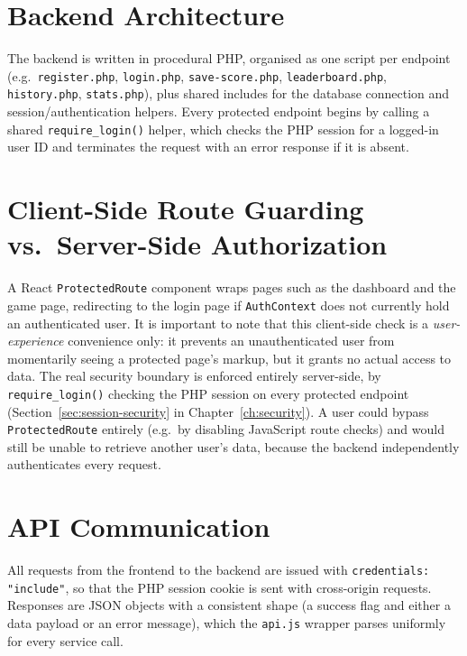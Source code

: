 \section{Backend Architecture}
The backend is written in procedural PHP, organised as one script per
endpoint (e.g.\ \texttt{register.php}, \texttt{login.php},
\texttt{save-score.php}, \texttt{leaderboard.php}, \texttt{history.php},
\texttt{stats.php}), plus shared includes for the database connection and
session/authentication helpers. Every protected endpoint begins by calling a
shared \texttt{require\_login()} helper, which checks the PHP session for a
logged-in user ID and terminates the request with an error response if it
is absent.

\section{Client-Side Route Guarding vs.\ Server-Side Authorization}
A React \texttt{ProtectedRoute} component wraps pages such as the dashboard
and the game page, redirecting to the login page if \texttt{AuthContext}
does not currently hold an authenticated user. It is important to note that
this client-side check is a \emph{user-experience} convenience only: it
prevents an unauthenticated user from momentarily seeing a protected page's
markup, but it grants no actual access to data. The real security boundary
is enforced entirely server-side, by \texttt{require\_login()} checking the
PHP session on every protected endpoint (Section~\ref{sec:session-security}
in Chapter~\ref{ch:security}). A user could bypass \texttt{ProtectedRoute}
entirely (e.g.\ by disabling JavaScript route checks) and would still be
unable to retrieve another user's data, because the backend independently
authenticates every request.

\section{API Communication}
All requests from the frontend to the backend are issued with
\texttt{credentials: "include"}, so that the PHP session cookie is sent with
cross-origin requests. Responses are JSON objects with a consistent shape
(a success flag and either a data payload or an error message), which the
\texttt{api.js} wrapper parses uniformly for every service call.
